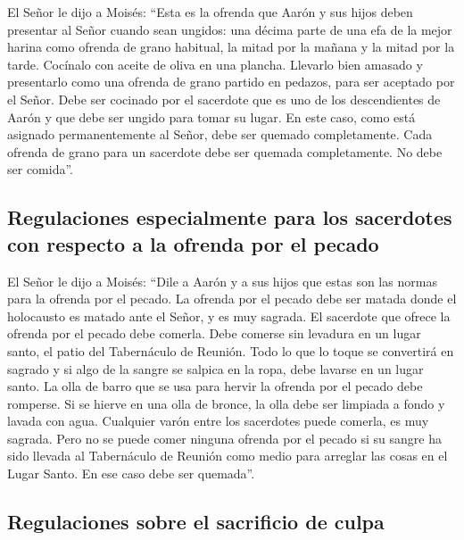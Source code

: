  El Señor le dijo a Moisés:  ``Esta es la
ofrenda que Aarón y sus hijos deben presentar al Señor cuando sean
ungidos: una décima parte de una efa de la mejor harina como ofrenda de
grano habitual, la mitad por la mañana y la mitad por la tarde.
 Cocínalo con aceite de oliva en una plancha. Llevarlo
bien amasado y presentarlo como una ofrenda de grano partido en pedazos,
para ser aceptado por el Señor.  Debe ser cocinado por el
sacerdote que es uno de los descendientes de Aarón y que debe ser ungido
para tomar su lugar. En este caso, como está asignado permanentemente al
Señor, debe ser quemado completamente.  Cada ofrenda de
grano para un sacerdote debe ser quemada completamente. No debe ser
comida''.

\hypertarget{regulaciones-especialmente-para-los-sacerdotes-con-respecto-a-la-ofrenda-por-el-pecado}{%
\subsection{Regulaciones especialmente para los sacerdotes con respecto
a la ofrenda por el
pecado}\label{regulaciones-especialmente-para-los-sacerdotes-con-respecto-a-la-ofrenda-por-el-pecado}}

 El Señor le dijo a Moisés:  ``Dile a
Aarón y a sus hijos que estas son las normas para la ofrenda por el
pecado. La ofrenda por el pecado debe ser matada donde el holocausto es
matado ante el Señor, y es muy sagrada.  El sacerdote que
ofrece la ofrenda por el pecado debe comerla. Debe comerse sin levadura
en un lugar santo, el patio del Tabernáculo de Reunión. 
Todo lo que lo toque se convertirá en sagrado y si algo de la sangre se
salpica en la ropa, debe lavarse en un lugar santo.  La
olla de barro que se usa para hervir la ofrenda por el pecado debe
romperse. Si se hierve en una olla de bronce, la olla debe ser limpiada
a fondo y lavada con agua.  Cualquier varón entre los
sacerdotes puede comerla, es muy sagrada.  Pero no se
puede comer ninguna ofrenda por el pecado si su sangre ha sido llevada
al Tabernáculo de Reunión como medio para arreglar las cosas en el Lugar
Santo. En ese caso debe ser quemada''.

\hypertarget{regulaciones-sobre-el-sacrificio-de-culpa}{%
\subsection{Regulaciones sobre el sacrificio de
culpa}\label{regulaciones-sobre-el-sacrificio-de-culpa}}

